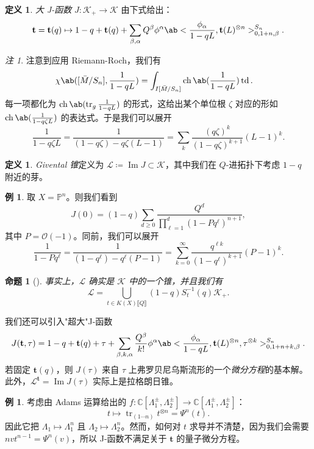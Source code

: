 \documentclass{amsart}
\newtheorem{prop}[thm]{命题}
\theoremstyle{definition}
\newtheorem{defn}[thm]{定义}
\newtheorem{exm}[thm]{例}
\theoremstyle{remark}
\newtheorem{rmk}[thm]{注}
\theoremstyle{plain}
\theoremstyle{definition}
\theoremstyle{remark}
\DeclareMathOperator{\Ima}{Im}
\newcommand{\C}{\mathbb{C}}
\renewcommand{\P}{\mathbb{P}}
\newcommand{\mc}[1]{\mathcal{#1}}
\newcommand{\on}[1]{\operatorname{#1}}
\newcommand{\1}{\mathbf{1}}
\newcommand{\2}{\mathbf{2}}
\newcommand{\3}{\mathbf{3}}
\newcommand{\ps}[1]{\llbracket #1 \rrbracket}
\begin{document}
\begin{defn}
    \textit{大 J-函数} \(J \colon \mc{K}_+ \to \mc{K}\) 由下式给出：
    \[ \mathbf{t} = \mathbf{t}(q) \mapsto 1 - q + \mathbf{t}(q) + \sum_{\beta, \alpha} Q^{\beta} \phi^{\alpha} \ab< \frac{\phi_{\alpha}}{1-qL}, \mathbf{t}(L)^{\otimes n}>_{0, 1+n, \beta}^{S_n}. \]
\end{defn}

\begin{rmk}
    注意到应用 Riemann-Roch，我们有
    \begin{align*}
        \chi\ab([\bar{M}/S_n], \frac{1}{1-qL}) &= \int_{I[\bar{M}/S_n]} \on{ch}\ab(\frac{1}{1-qL}) \on{td}.
    \end{align*}
    每一项都化为 \(\on{ch}\ab(\on{tr}_g \frac{1}{1-qL})\) 的形式，这给出某个单位根 \(\zeta\) 对应的形如 \(\on{ch}\ab(\frac{1}{1-q\zeta L})\) 的表达式。于是我们可以展开
    \[ \frac{1}{1-q\zeta L} = \frac{1}{(1-q \zeta) - q\zeta (L-1)} = \sum_k \frac{(q\zeta)^k}{(1-q\zeta)^{k+1}}(L-1)^k. \]
\end{rmk}

\begin{defn}
    \textit{Givental 锥}定义为 \(\mc{L} \coloneqq \Ima J \subset \mc{K}\)，其中我们在 \(Q\)-进拓扑下考虑 \(1-q\) 附近的芽。
\end{defn}

\begin{exm}
    取 \(X = \P^n\)。则我们看到
    \[ J(0) = (1-q) \sum_{d \geq 0} \frac{Q^d}{\prod_{\ell=1}^d (1-Pq^{\ell})^{n+1}}, \]
    其中 \(P = \mc{O}(-1)\)。同前，我们可以展开
    \[ \frac{1}{1-P q^{\ell}} = \frac{1}{(1-q^{\ell}) - q^{\ell}(P-1)} = \sum_{k=0}^{\infty} \frac{q^{\ell k}}{(1-q^{\ell})^{k+1}}(P-1)^k. \]
\end{exm}

\begin{prop}[{\cite{GiventalK7}}]
    事实上，\(\mc{L}\) 确实是 \(\mc{K}\) 中的一个锥，并且我们有
    \[ \mc{L} = \bigcup_{t \in K(X)\ps{Q}} (1-q) S_{t}^{-1}(q) \mc{K}_+. \]
\end{prop}

我们还可以引入"超大"J-函数
\[ J(\mathbf{t}, \tau) = 1-q + \mathbf{t}(q) + \tau + \sum_{\beta, k, \alpha} \frac{Q^{\beta}}{k!} \phi^{\alpha} \ab< \frac{\phi_{\alpha}}{1-qL}, \mathbf{t}(L)^{\otimes n}, \tau^{\otimes k}>_{0,1+n+k,\beta}^{S_n}. \]
若固定 \(\mathbf{t}(q)\)，则 \(J(\tau)\) 来自 \(\tau\) 上弗罗贝尼乌斯流形的一个\textit{微分方程}的基本解。此外，\(\mc{L}^{\mathbf{t}}=  \Ima J(\tau)\) 实际上是拉格朗日锥。

\begin{exm}
    考虑由 Adams 运算给出的 \(f \colon \C[\Lambda_1^{\pm}, \Lambda_2^{\pm}] \to \C[\Lambda_1^{\pm}, \Lambda_2^{\pm}]\)：
    \[ t \mapsto \on{tr}_{(1\cdots n)} t^{\otimes n} = \Psi^n (t). \]
    因此它把 \(\Lambda_1 \mapsto \Lambda_1^n\) 且 \(\Lambda_2 \mapsto \Lambda_2^n\)。然而，如何对 \(t\) 求导并不清楚，因为我们会需要 \(nv t^{n-1} = \Psi^n(v)\)，所以 J-函数不满足关于 \(\mathbf{t}\) 的量子微分方程。
\end{exm}
\end{document}
